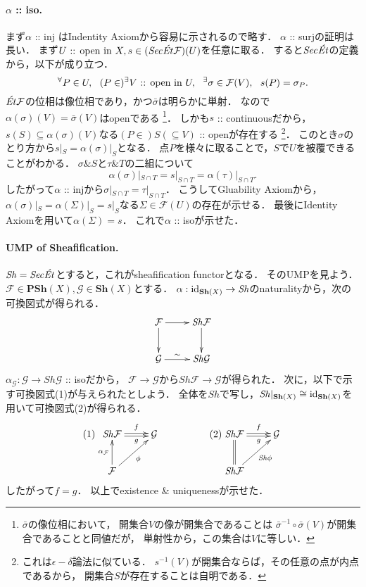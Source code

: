 \documentclass[a4paper]{jsarticle}
\newcommand{\shF}{\mathcal{F}}
\newcommand{\shG}{\mathcal{G}}
\newcommand{\Sh}{\mathbf{Sh}}
\newcommand{\PSh}{\mathbf{PSh}}
\newcommand{\ftorSh}{\mathit{Sh}}
\newcommand{\ftorSec}{\mathit{Sec}}
\newcommand{\ftorEt}{\text{\textit{\'Et}}}
\newcommand{\OpenIn}{\text{ :: open in }}
\begin{document}
    \paragraph{$\alpha$ :: iso.}
    まず$\alpha$ :: inj はIndentity Axiomから容易に示されるので略す．
    $\alpha$ :: surjの証明は長い．
    まず$U \OpenIn X, s \in (\ftorSec \ftorEt \shF)(U)$を任意に取る．
    すると$\ftorSec \ftorEt$の定義から，以下が成り立つ．
    \[ \Forall{P \in U} (P \in)\Exists{V \OpenIn U} \Exists{\sigma \in \shF(V)} s(P)=\sigma_P. \]
    $\ftorEt \shF$の位相は像位相であり，かつ$\bar{\sigma}$は明らかに単射．
    なので$\alpha(\sigma)(V)=\bar{\sigma}(V)$はopenである
    \footnote
    {
        $\bar{\sigma}$の像位相において，
        開集合$V$の像が開集合であることは
        $\bar{\sigma}^{-1} \circ \bar{\sigma}(V)$が開集合であることと同値だが，
        単射性から，この集合は$V$に等しい．
    }．
    しかも$s$ :: continuousだから，
    $s(S) \subseteq \alpha(\sigma)(V)$なる$(P \in)S(\subseteq V)$ :: openが存在する
    \footnote
    {
        これは$\epsilon-\delta$論法に似ている．
        $s^{-1}(V)$が開集合ならば，その任意の点が内点であるから，
        開集合$S$が存在することは自明である．
    }．
    このとき$\sigma$のとり方から$s|_S=\alpha(\sigma)|_S$となる．
    点$P$を様々に取ることで，$S$で$U$を被覆できることがわかる．
    $\sigma \& S$と$\tau \& T$の二組について
    \[ \alpha(\sigma)|_{S \cap T}=s|_{S \cap T}=\alpha(\tau)|_{S \cap T}. \]
    したがって$\alpha$ :: injから$\sigma|_{S \cap T}=\tau|_{S \cap T}$．
    こうしてGluability Axiomから，
    $\alpha(\sigma)|_S=\alpha(\Sigma)|_S=s|_S$なる$\Sigma \in \shF(U)$の存在が示せる．
    最後にIdentity Axiomを用いて$\alpha(\Sigma)=s$．
    これで$\alpha$ :: isoが示せた．

    \paragraph{UMP of Sheafification.}
    $\ftorSh=\ftorSec \ftorEt$とすると，これがsheafification functorとなる．
    そのUMPを見よう．
    $\shF \in \PSh(X), \shG \in \Sh(X)$とする．
    $\alpha: \id{\Sh(X)} \to \ftorSh$のnaturalityから，次の可換図式が得られる．
    \[
    \xymatrix
    {
    \shF \ar[r] \ar[d]& \ftorSh \shF \ar[d]\\
    \shG \ar[r]^-{\sim}& \ftorSh \shG
    }
    \]
    $\alpha_{\shG}: \shG \to \ftorSh \shG$ :: isoだから，
    $\shF \to \shG$から$\ftorSh \shF \to \shG$が得られた．
    次に，以下で示す可換図式(1)が与えられたとしよう．
    全体を$\ftorSh$で写し，$\ftorSh|_{\Sh(X)} \cong \id{\Sh(X)}$を用いて可換図式(2)が得られる．
    \[
    (1)
    \xymatrix
    {
        \ftorSh \shF \ar@<0.5mm>[r]^-{f} \ar@<-0.5mm>[r]_-{g}& \shG \\
        \shF \ar[u]^-{\alpha_{\shF}} \ar[ur]_-{\phi} & {}
    }
    \hspace{5em}
    (2)
    \xymatrix
    {
        \ftorSh \shF \ar@<0.5mm>[r]^-{f} \ar@<-0.5mm>[r]_-{g}& \shG \\
        \ftorSh \shF \ar@{=}[u] \ar[ur]_-{\ftorSh \phi} & {}
    }
    \]
    したがって$f=g$．
    以上でexistence \& uniquenessが示せた．
\end{document}
